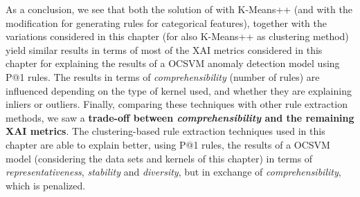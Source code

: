 As a conclusion, we see that both the solution of \parencite{nunez2002rule} with K-Means++ (and with the modification for generating rules for categorical features), together with the variations considered in this chapter (for also K-Means++ as clustering method) yield similar results in terms of most of the XAI metrics considered in this chapter for explaining the results of a OCSVM anomaly detection model using P@1 rules. The results in terms of \textit{comprehensibility} (number of rules) are influenced depending on the type of kernel used, and whether they are explaining inliers or outliers. Finally, comparing these techniques with other rule extraction methods, we saw a \textbf{trade-off between \textit{comprehensibility} and the remaining XAI metrics}. The clustering-based rule extraction techniques used in this chapter are able to explain better, using P@1 rules, the results of a OCSVM model (considering the data sets and kernels of this chapter) in terms of \textit{representativeness}, \textit{stability} and \textit{diversity}, but in exchange of \textit{comprehensibility}, which is penalized.


